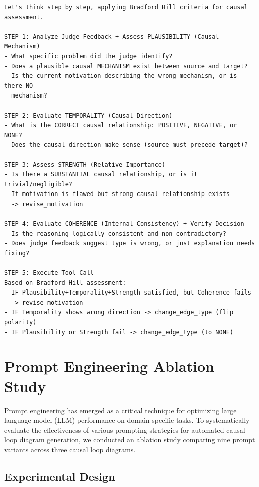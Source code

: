 \begin{small}
\begin{verbatim}
Let's think step by step, applying Bradford Hill criteria for causal assessment.

STEP 1: Analyze Judge Feedback + Assess PLAUSIBILITY (Causal Mechanism)
- What specific problem did the judge identify?
- Does a plausible causal MECHANISM exist between source and target?
- Is the current motivation describing the wrong mechanism, or is there NO
  mechanism?

STEP 2: Evaluate TEMPORALITY (Causal Direction)
- What is the CORRECT causal relationship: POSITIVE, NEGATIVE, or NONE?
- Does the causal direction make sense (source must precede target)?

STEP 3: Assess STRENGTH (Relative Importance)
- Is there a SUBSTANTIAL causal relationship, or is it trivial/negligible?
- If motivation is flawed but strong causal relationship exists
  -> revise_motivation

STEP 4: Evaluate COHERENCE (Internal Consistency) + Verify Decision
- Is the reasoning logically consistent and non-contradictory?
- Does judge feedback suggest type is wrong, or just explanation needs fixing?

STEP 5: Execute Tool Call
Based on Bradford Hill assessment:
- IF Plausibility+Temporality+Strength satisfied, but Coherence fails
  -> revise_motivation
- IF Temporality shows wrong direction -> change_edge_type (flip polarity)
- IF Plausibility or Strength fail -> change_edge_type (to NONE)
\end{verbatim}
\end{small}

\section{Prompt Engineering Ablation Study}
\label{sec:ablation_edge}

Prompt engineering has emerged as a critical technique for optimizing large language model (LLM) performance on domain-specific tasks. To systematically evaluate the effectiveness of various prompting strategies for automated causal loop diagram generation, we conducted an ablation study comparing nine prompt variants across three causal loop diagrams.

\subsection{Experimental Design}

